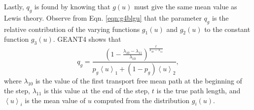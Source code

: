 Lastly, $q_g$ is found by knowing that $g(u)$ must give the same mean value as Lewis theory. Observe from Eqn. \ref{eqn:g4blgu} that the parameter $q_g$ is the relative contribution of the varying functions $g_1(u)$ and $g_2(u)$ to the constant function $g_3(u)$. GEANT4 \cite{geant4} shows that
%
\begin{equation}
q_g=\frac{(1-\frac{\lambda_{10}-\lambda_{11}}{\lambda_{10}})^{\frac{t}{\lambda_{10}-\lambda_{11}}}}{p_g\left<u\right>_1+(1-p_g)\left<u\right>_2},
\label{eqn:geantq}
\end{equation}
where $\lambda_{10}$ is the value of the first transport free mean path at the beginning of the step, $\lambda_{11}$ is this value at the end of the step, $t$ is the true path length, and $\left<u\right>_i$ is the mean value of $u$ computed from the distribution $g_i(u)$.


